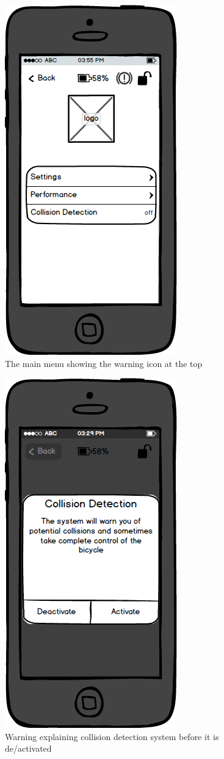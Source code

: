 \documentclass[a4paper]{report}
\begin{document}
\clearpage
\begin{figure}
\centering
\includegraphics[scale=0.9]{figures/prototype_1/main_menu_warn}
\caption{The main menu showing the warning icon at the top}
\end{figure}
\clearpage
\begin{figure}
\centering
\includegraphics[scale=0.8]{figures/prototype_1/collision_activate}
\caption{Warning explaining collision detection system before it is de/activated}
\end{figure}
\end{document}
